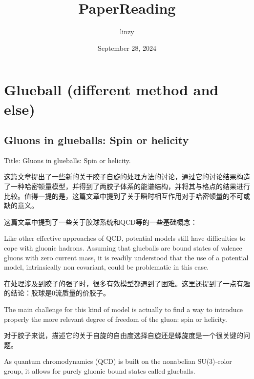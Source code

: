 \documentclass{article}
\title{PaperReading}
\author{linzy}
\date{September 28, 2024}
\begin{document}
\maketitle

\tableofcontents

\newpage

\section{Glueball (different method and else)}


\subsection{Gluons in glueballs: Spin or helicity}
Title: Gluons in glueballs: Spin or helicity. \cite{Mathieu:2008bf}

这篇文章提出了一些新的关于胶子自旋的处理方法的讨论，通过它的讨论结果构造了一种哈密顿量模型，并得到了两胶子体系的能谱结构，并将其与格点的结果进行比较。值得一提的是，这篇文章中提到了关于瞬时相互作用对于哈密顿量的不可或缺的意义。

这篇文章中提到了一些关于胶球系统和QCD等的一些基础概念：

Like other effective approaches of QCD, potential models still have difficulties to cope
with gluonic hadrons. Assuming that glueballs are bound states of valence gluons with zero current
mass, it is readily understood that the use of a potential model, intrinsically non covariant, could
be problematic in this case.

在处理涉及到胶子的强子时，很多有效模型都遇到了困难。这里还提到了一点有趣的结论：胶球是0流质量的价胶子。

The main challenge for this kind of model is actually to find a way
to introduce properly the more relevant degree of freedom of the gluon: spin or helicity.

对于胶子来说，描述它的关于自旋的自由度选择自旋还是螺旋度是一个很关键的问题。

As quantum chromodynamics (QCD) is built on the nonabelian SU(3)-color group, it allows for purely gluonic bound states called glueballs.
\end{document}
